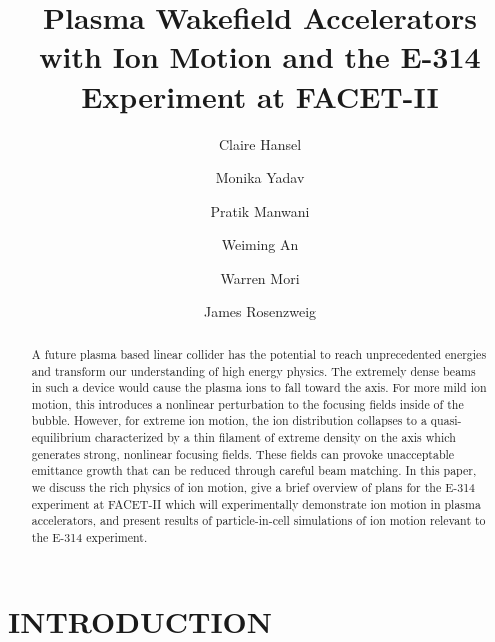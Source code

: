 \documentclass{aac}
\begin{document}
\title{Plasma Wakefield Accelerators with Ion Motion and the E-314 Experiment at FACET-II}

\author[aff1]{Claire Hansel}
\author[aff1,aff2,aff3]{Monika Yadav}
\author[aff1]{Pratik Manwani}
\author[aff1]{Weiming An}
\author[aff1]{Warren Mori}
\author[aff1]{James Rosenzweig}


\maketitle

\begin{abstract}
A future plasma based linear collider has the potential to reach unprecedented energies and transform our understanding of high energy physics. The extremely dense beams in such a device would cause the plasma ions to fall toward the axis. For more mild ion motion, this introduces a nonlinear perturbation to the focusing fields inside of the bubble. However, for extreme ion motion, the ion distribution collapses to a quasi-equilibrium characterized by a thin filament of extreme density on the axis which generates strong, nonlinear focusing fields. These fields can provoke unacceptable emittance growth that can be reduced through careful beam matching. In this paper, we discuss the rich physics of ion motion, give a brief overview of plans for the E-314 experiment at FACET-II which will experimentally demonstrate ion motion in plasma accelerators, and present results of particle-in-cell simulations of ion motion relevant to the E-314 experiment. 
\end{abstract}

\section{INTRODUCTION}
\end{document}
